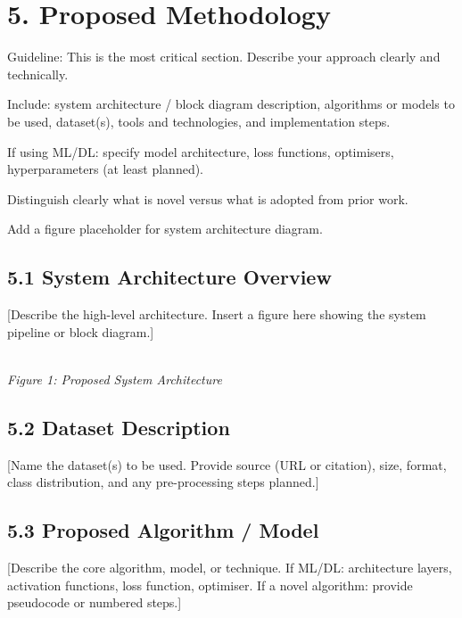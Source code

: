 \documentclass[12pt,a4paper]{article}
\newcommand{\redsec}[1]{\section*{\color{dred}#1}\vspace{-4pt}}
\newcommand{\dredrule}{\noindent{\color{dred}\rule{\linewidth}{0.5pt}}\par\vspace{4pt}}
\newcommand{\bluesub}[1]{\subsection*{\color{azure}#1}}
\begin{document}
\redsec{5. Proposed Methodology}
\dredrule
\begin{guide}{Guideline:}
This is the most critical section. Describe your approach clearly and technically.\par
Include: system architecture / block diagram description, algorithms or models to be used, dataset(s), tools and technologies, and implementation steps.\par
If using ML/DL: specify model architecture, loss functions, optimisers, hyperparameters (at least planned).\par
Distinguish clearly what is novel versus what is adopted from prior work.\par
Add a figure placeholder for system architecture diagram.
\end{guide}

\bluesub{5.1 System Architecture Overview}
[Describe the high-level architecture. Insert a figure here showing the system pipeline or block diagram.]

\begin{tcolorbox}[enhanced,colback=white,colframe=gborder,boxrule=0.5pt,arc=0pt,
  borderline={0.5pt}{0pt}{gborder,dashed},frame hidden,height=3.4cm,valign=center,halign=center]
\centering{}\\
{\itshape\color{gtext}\small Figure 1: Proposed System Architecture}
\end{tcolorbox}

\bluesub{5.2 Dataset Description}
[Name the dataset(s) to be used. Provide source (URL or citation), size, format, class distribution, and any pre-processing steps planned.]

\bluesub{5.3 Proposed Algorithm / Model}
[Describe the core algorithm, model, or technique. If ML/DL: architecture layers, activation functions, loss function, optimiser. If a novel algorithm: provide pseudocode or numbered steps.]
\end{document}
